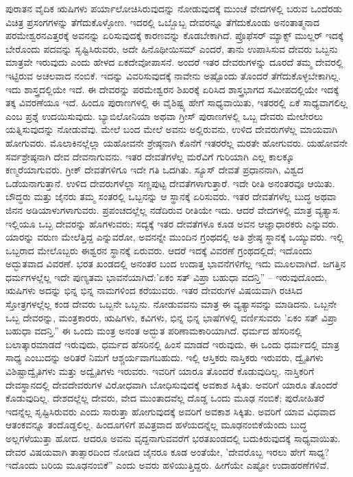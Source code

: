 ಪುರಾತನ ವೈದಿಕ ಋಷಿಗಳು ಪರ್ಯಾಲೋಚಿಸಿರುವುದನ್ನು ನೋಡುವುದಕ್ಕೆ ಮುಂಚೆ ವೇದಗಳಲ್ಲಿ ಬರುವ ಒಂದೆರಡು ವಿಚಿತ್ರ ಪ್ರಸಂಗಗಳನ್ನು ತೆಗೆದುಕೊಳ್ಳೋಣ. ಇದರಲ್ಲಿ ಒಬ್ಬೊಬ್ಬ ದೇವರನ್ನೂ ತೆಗೆದುಕೊಂಡು ಅನಂತಾತ್ಮನಾದ ಪರಮೇಶ್ವರನ\break ಎತ್ತರಕ್ಕೆ ಅವನನ್ನು ಏರಿಸುವುದಕ್ಕೆ ಕಾರಣವನ್ನು ಕೊಡಬೇಕಾಗಿದೆ. ಪ್ರೊಫೆಸರ್‌ ಮ್ಯಾಕ್ಸ್ ಮುಲ್ಲರ್ ಇದಕ್ಕೆ ಬೇರೊಂದು ಪದವನ್ನು ಸೃಷ್ಟಿಸಿರುವರು, ಅದೇ ಹಿನೊಥೀಯಿಸಮ್  ಎಂದರೆ, ತಾನು ಉಪಾಸಿಸುವ ದೇವರು ಒಬ್ಬನು ಮಾತ್ರವೇ ಇರುವುದು ಎಂದು ಹೇಳದ ಏಕದೇವೋಪಾಸನೆ. ಅಂದರೆ ಇತರ ದೇವರುಗಳನ್ನು ದೂರದೆ ತಮ್ಮ ದೇವರಲ್ಲಿ ಇಟ್ಟಿರುವ ಅಚಲವಾದ ನಂಬಿಕೆ. ಇದನ್ನು ವಿವರಿಸುವುದಕ್ಕೆ ನಾವೇನು ಅಷ್ಟೊಂದು ತೊಂದರೆ ತೆಗೆದುಕೊಳ್ಳಬೇಕಾಗಿಲ್ಲ. ಇದು ಶಾಸ್ತ್ರದಲ್ಲಿಯೇ ಇದೆ. ಈ ದೇವರನ್ನು ಪರಮೇಶ್ವರನ ಶಿಖರಕ್ಕೆ ಏರಿಸಿದ ಶಾಸ್ತ್ರಭಾಗದ ಸಮೀಪದಲ್ಲಿಯೇ ಇದಕ್ಕೆ ತಕ್ಕ ವಿವರಣೆಯೂ ಇದೆ. ಹಿಂದೂ ಪುರಾಣಗಳಲ್ಲಿ ಈ ವೈಶಿಷ್ಟ್ಯ ಹೇಗೆ ಸಾಧ್ಯವಾಯಿತು, ಇತರರಲ್ಲಿ ಏಕೆ ಸಾಧ್ಯವಾಗಲಿಲ್ಲ ಎಂಬ ಪ್ರಶ್ನೆ ಉದಯಿಸುವುದು. ಬ್ಯಾಬಿಲೋನಿಯಾ ಅಥವಾ ಗ್ರೀಸ್ ಪುರಾಣಗಳಲ್ಲಿ ಒಬ್ಬ ದೇವರು ಮೇಲೇರಲು ಯತ್ನಿಸುವುದನ್ನು ನೋಡುವೆವು. ಮೇಲೆ ಬಂದ ಮೇಲೆ ಅವನು ಅಲ್ಲಿರುವನು, ಉಳಿದ ದೇವರುಗಳೆಲ್ಲ ಮಾಯವಾಗಿ ಹೋಗುವರು. ಮೊಲಾಕಿನಲ್ಲೆಲ್ಲಾ ಯಹೋವನೇ ಶ್ರೇಷ್ಠನಾಗಿ ಕೊನೆಗೆ ಇತರರೆಲ್ಲ ಮರತೇ ಹೋಗುವರು. ಯಹೋವನೇ ಸರ್ವಶ್ರೇಷ್ಠನಾಗಿ ದೇವ ದೇವನಾಗುವನು. ಇತರ ದೇವತೆಗಳೆಲ್ಲ ಮರೆವಿಗೆ ಗುರಿಯಾಗಿ ಎಲ್ಲ ಕಾಲಕ್ಕೂ ಕಣ್ಮರೆಯಾಗುವರು. ಗ್ರೀಕ್ ದೇವತೆಗಳಿಗೂ ಇದೇ ಗತಿ ಒದಗಿತು. ಸ್ಯೂಸ್ ದೇವತೆ ಪ್ರಧಾನನಾಗಿ, ವಿಶ್ವದ ಒಡೆಯನಾಗುತ್ತಾನೆ. ಉಳಿದ ದೇವರುಗಳೆಲ್ಲಾ ಸಣ್ಣಪುಟ್ಟ ದೇವತೆಗಳಾಗುತ್ತಾರೆ. ಇದೇ ರೀತಿ ಅನಂತರವೂ ಆಯಿತು. ಬೌದ್ಧರು ಮತ್ತು ಜೈನರು ತಮ್ಮ ಸಂತರಲ್ಲಿ ಒಬ್ಬನನ್ನು ಆ ಸ್ಥಾನಕ್ಕೆ ಏರಿಸುವರು. ಇತರ ದೇವತೆಗಳೆಲ್ಲ ಬುದ್ಧ ಅಥವಾ ಜಿನನ ಅಡಿಯಾಳುಗಳಾಗುವರು. ಪ್ರಪಂಚದಲ್ಲೆಲ್ಲ ನಡೆದಿರುವ ರೀತಿಯೇ ಇದು. ಆದರೆ ವೇದಗಳಲ್ಲಿ ಮಾತ್ರ ವ್ಯತ್ಯಾಸ. ಇಲ್ಲಿಯೂ ಒಬ್ಬ ದೇವರನ್ನು ಹೊಗಳುವರು; ಸದ್ಯಕ್ಕೆ ಇತರ ದೇವತೆಗಳೂ ಕೂಡ ಅವನ ಆಜ್ಞಾಧಾರಕರು ಎನ್ನುವರು. ಯಾರನ್ನು ವರುಣ ಮೇಲೆತ್ತಿದ್ದ ಎನ್ನುವರೋ, ಅವನನ್ನೇ ಮುಂದಿನ ಗ್ರಂಥದಲ್ಲಿ ಅತಿ ಶ್ರೇಷ್ಠ ಸ್ಥಾನಕ್ಕೆ ಒಯ್ಯುವರು. ಇಲ್ಲಿ ಒಬ್ಬರಾದ ಮೇಲೊಬ್ಬರು ಈಶ್ವರನ ಸ್ಥಾನಕ್ಕೆ ಏರುವರು. ಆದರೆ ಇದಕ್ಕೆ ವಿವರಣೆ ಗ್ರಂಥದಲ್ಲಿದೆ; ಇದೊಂದು ಅದ್ಭುತವಾದ ವಿವರಣೆ. ಭರತ ಖಂಡದಲ್ಲಿ ಅನಂತರ ಬಂದ ಉದಾತ್ತ ಭಾವನೆಗಳಿಗೆಲ್ಲ ಇದು ಮೂಲವಾಗಿದೆ. ಜಗತ್ತಿನ ಧರ್ಮಗಳಲ್ಲೆಲ್ಲ ಇದೇ ಪುಣ್ಯತಮ ಭಾವನೆಯಾಗಿದೆ:\break 'ಏಕಂ ಸತ್ ವಿಪ್ರಾ ಬಹುಧಾ ವದನ್ತಿ” – ಇರುವುದೊಂದು, ಋಷಿಗಳು ಅದನ್ನು ಭಿನ್ನ ಭಿನ್ನ ನಾಮಗಳಿಂದ ಕರೆಯುವರು. ಇತರ ದೇವರುಗಳ ವಿಷಯವಾಗಿ ರಚಿಸಿದ ಸ್ತೋತ್ರಗಳಲ್ಲೆಲ್ಲ ಕಂಡ ದೇವರು ಒಬ್ಬನೇ ಒಬ್ಬನು. ನೋಡುವವನು ಮಾತ್ರ ಈ ವ್ಯತ್ಯಾಸವನ್ನು ಮಾಡಿದನು. ಒಬ್ಬನೇ ಒಬ್ಬ ದೇವರನ್ನು, ಮಂತ್ರಕಾರರು, ಋಷಿಗಳು, ಕವಿಗಳು, ಭಿನ್ನ ಭಿನ್ನ ಭಾಷೆಗಳಲ್ಲಿ ವರ್ಣಿಸುವರು 'ಏಕಂ ಸತ್ ವಿಪ್ರಾ ಬಹುಧಾ ವದನ್ತಿ.'' ಈ ಒಂದು ಮಂತ್ರ ಅನಂತ ಅದ್ಭುತ ಪರಿಣಾಮಕಾರಿಯಾಗಿದೆ. ಧರ್ಮದ ಹೆಸರಿನಲ್ಲಿ ಬಲಾತ್ಕಾರಮಾಡದೆ ಇರುವುದು, ಧರ್ಮದ ಹೆಸರಿನಲ್ಲಿ ಹಿಂಸೆ ಮಾಡದೆ ಇರುವುದು, ಈ ಒಂದು ಧರ್ಮದಲ್ಲಿ ಮಾತ್ರ ಸಾಧ್ಯ ಎಂಬುದನ್ನು ಅರಿತರೆ ನಿಮಗೆ ಆಶ್ಚರ್ಯವಾಗಬಹುದು. ಇಲ್ಲಿ ಆಸ್ತಿಕರು ನಾಸ್ತಿಕರು ಇರುವರು, ದ್ವೈತಿಗಳು ವಿಶಿಷ್ಟಾದ್ವೈತಿಗಳು ಮತ್ತು ಅದ್ವೈತಿಗಳು ಇರುವರು. ಇವರಿಗೆ ಯಾರೂ ತೊಂದರೆ ಕೊಡುವುದಿಲ್ಲ. ನಾಸ್ತಿಕರಿಗೆ ದೇವಸ್ಥಾನದಲ್ಲಿ ದೇವದೇವರುಗಳ ವಿರೋಧವಾಗಿ ಬೋಧಿಸುವುದಕ್ಕೆ ಅವಕಾಶ ಸಿಕ್ಕಿತು. ಅವರಿಗೆ ಯಾರೂ ತೊಂದರೆ ಕೊಡುವುದಿಲ್ಲ. ದೇಶದಲ್ಲೆಲ್ಲ ದೇವರು, ವೇದ ಮುಂತಾದವೆಲ್ಲ ದೊಡ್ಡ ಒಂದು ಮೂಢ ನಂಬಿಕೆ; ಪುರೋಹಿತರೆ ಇದನ್ನೆಲ್ಲ ಸೃಷ್ಟಿಸಿರುವರು ಎಂದು ಸಾರುತ್ತಾ ಹೋಗುವುದಕ್ಕೆ ಅವರಿಗೆ ಅವಕಾಶ ಸಿಕ್ಕಿತು. ಅವರಿಗೆ ಯಾವ ವಿಧವಾದ ಆತಂಕವನ್ನೂ ತಂದೊಡ್ಡಲಿಲ್ಲ. ಹಿಂದೂಗಳಿಗೆ ಪವಿತ್ರವಾದ ಹಳೆಯದನ್ನೆಲ್ಲ ಮೂಢನಂಬಿಕೆಯೆಂದು ಬುದ್ಧ ಅಲ್ಲಗಳೆಯುತ್ತಾ ಹೋದ. ಆದರೂ ಅವನು ವೃದ್ದನಾಗುವವರೆಗೆ ಭರತಖಂಡದಲ್ಲಿ ಬದುಕಿರುವುದಕ್ಕೆ ಸಾಧ್ಯವಾಯಿತು. ದೇವರ ವಿಷಯವಾಗಿ ತಾತ್ಸಾರದಿಂದ ನೋಡಿದ ಜೈನರೂ ಕೂಡ ಅಂತೆಯೇ, 'ದೇವರೊಬ್ಬ ಇರಲು ಹೇಗೆ ಸಾಧ್ಯ? ಇದೊಂದು ಬರಿಯ ಮೂಢನಂಬಿಕೆ'' ಎಂದು ಅವರು ಹಳಿಯುತ್ತಿದ್ದರು. ಹೀಗೆಯೇ ಎಷ್ಟೋ ಉದಾಹರಣೆಗಳಿವೆ.


